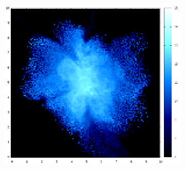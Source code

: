 \documentclass[journal]{IEEEtran}
\begin{document}
\begin{figure}[h!]
\begin{subfigure}[t]{0.25\textwidth}
	\end{subfigure}
	\quad
	\begin{subfigure}[t]{0.25\textwidth}
		\centering
		\includegraphics[width=\linewidth]{TEMP04-05.png}
	\end{subfigure}
\end{figure}
\end{document}
